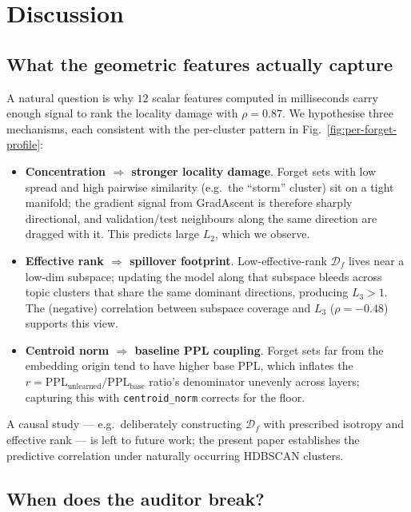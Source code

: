 \documentclass[11pt]{article}
\newcommand{\Df}{\mathcal{D}_f}
\newcommand{\PPL}{\mathrm{PPL}}
\newcommand{\Ltwo}{L_2}
\newcommand{\Lthree}{L_3}
\begin{document}
\section{Discussion}
\label{sec:discussion}

\subsection{What the geometric features actually capture}
\label{sec:why-it-works}

A natural question is why $12$ scalar features computed in milliseconds carry enough signal to rank the locality damage with $\rho{=}0.87$. We hypothesise three mechanisms, each consistent with the per-cluster pattern in Fig.~\ref{fig:per-forget-profile}:
\begin{itemize}
    \setlength\itemsep{0.15em}
    \item \textbf{Concentration $\Rightarrow$ stronger locality damage}. Forget sets with low spread and high pairwise similarity (e.g.\ the ``storm'' cluster) sit on a tight manifold; the gradient signal from GradAscent is therefore sharply directional, and validation/test neighbours along the same direction are dragged with it. This predicts large $\Ltwo$, which we observe.
    \item \textbf{Effective rank $\Rightarrow$ spillover footprint}. Low-effective-rank $\Df$ lives near a low-dim subspace; updating the model along that subspace bleeds across topic clusters that share the same dominant directions, producing $\Lthree{>}1$. The (negative) correlation between subspace coverage and $\Lthree$ ($\rho{=}{-}0.48$) supports this view.
    \item \textbf{Centroid norm $\Rightarrow$ baseline PPL coupling}. Forget sets far from the embedding origin tend to have higher base PPL, which inflates the $r{=}\PPL_{\text{unlearned}}/\PPL_{\text{base}}$ ratio's denominator unevenly across layers; capturing this with \texttt{centroid\_norm} corrects for the floor.
\end{itemize}
A causal study --- e.g.\ deliberately constructing $\Df$ with prescribed isotropy and effective rank --- is left to future work; the present paper establishes the predictive correlation under naturally occurring HDBSCAN clusters.

\subsection{When does the auditor break?}
\label{sec:failure}
\end{document}
